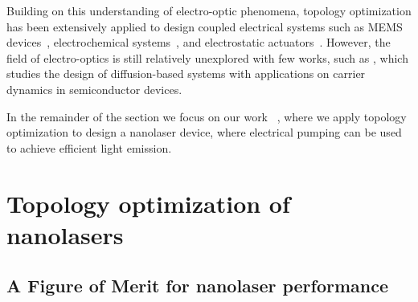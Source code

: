 Building on this understanding of electro-optic phenomena, topology optimization has been extensively applied to design coupled electrical systems such as MEMS devices~\cite{MEMS_multi}, electrochemical systems~\cite{electrode}, and electrostatic actuators~\cite{electrostatic_act}. However, the field of electro-optics is
still relatively unexplored with few works, such as \cite{g_heat}, which studies the design of diffusion-based systems with applications on
carrier dynamics in semiconductor devices.

In the remainder of the section we focus on our work~\cite{ownpub4} , where we apply topology 
optimization to design a nanolaser device, where electrical pumping can be used to achieve efficient light emission.

\section{Topology optimization of nanolasers~\cite{ownpub4}}\label{sec:laser}

\subsection*{A Figure of Merit for nanolaser performance}

